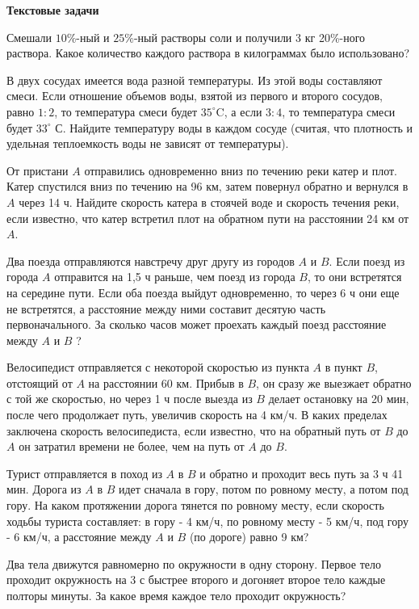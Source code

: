 \centerline{\bf \Huge Текстовые задачи}

 Смешали $10 \%$-ный и $25 \%$-ный растворы соли и получили 3 кг 20\%-ного раствора. Какое количество каждого раствора в килограммах было использовано?

 В двух сосудах имеется вода разной температуры. Из этой воды составляют смеси. Если отношение объемов воды, взятой из первого и второго сосудов, равно $1: 2$, то температура смеси будет $35^{\circ} \mathrm{C}$, а если $3: 4$, то температура смеси будет $33^{\circ}$ С. Найдите температуру воды в каждом сосуде (считая, что плотность и удельная теплоемкость воды не зависят от температуры).

 От пристани $A$ отправились одновременно вниз по течению реки катер и плот. Катер спустился вниз по течению на 96 км, затем повернул обратно и вернулся в $A$ через 14 ч. Найдите скорость катера в стоячей воде и скорость течения реки, если известно, что катер встретил плот на обратном пути на расстоянии 24 км от $A$.

 Два поезда отправляются навстречу друг другу из городов $A$ и $B$. Если поезд из города $A$ отправится на 1,5 ч раньше, чем поезд из города $B$, то они встретятся на середине пути. Если оба поезда выйдут одновременно, то через 6 ч они еще не встретятся, а расстояние между ними составит десятую часть первоначального. За сколько часов может проехать каждый поезд расстояние между $A$ и $B$ ?

 Велосипедист отправляется с некоторой скоростью из пункта $A$ в пункт $B$, отстоящий от $A$ на расстоянии 60 км. Прибыв в $B$, он сразу же выезжает обратно с той же скоростью, но через 1 ч после выезда из $B$ делает остановку на 20 мин, после чего продолжает путь, увеличив скорость на 4 км/ч. В каких пределах заключена скорость велосипедиста, если известно, что на обратный путь от $B$ до $A$ он затратил времени не более, чем на путь от $A$ до $B$.

 Турист отправляется в поход из $A$ в $B$ и обратно и проходит весь путь за 3 ч 41 мин. Дорога из $A$ в $B$ идет сначала в гору, потом по ровному месту, а потом под гору. На каком протяжении дорога тянется по ровному месту, если скорость ходьбы туриста составляет: в гору - 4 км/ч, по ровному месту - 5 км/ч, под гору - 6 км/ч, а расстояние между $A$ и $B$ (по дороге) равно 9 км?


 Два тела движутся равномерно по окружности в одну сторону. Первое тело проходит окружность на 3 с быстрее второго и догоняет второе тело каждые полторы минуты. За какое время каждое тело проходит окружность?

